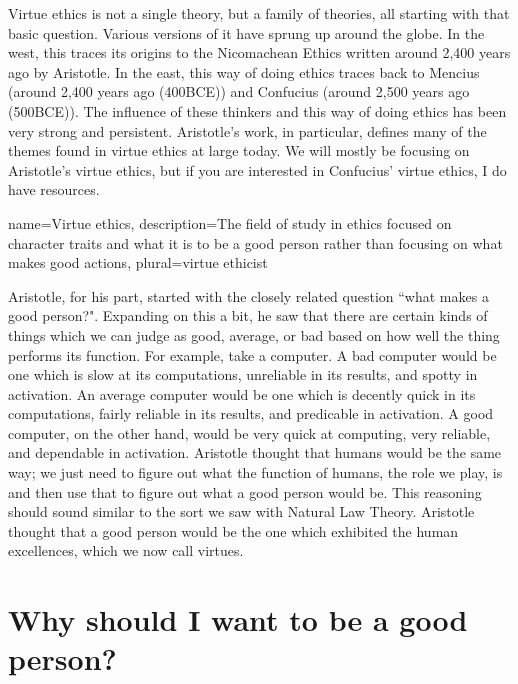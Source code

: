 \Gls{Virtue ethics} is not a single theory, but a family of theories, all starting with that basic question. Various versions of it have sprung up around the globe. In the west, this traces its origins to the Nicomachean Ethics written around 2,400 years ago by Aristotle. In the east, this way of doing ethics traces back to Mencius (around 2,400 years ago (400BCE)) and Confucius (around 2,500 years ago (500BCE)). The influence of these thinkers and this way of doing ethics has been very strong and persistent. Aristotle’s work, in particular, defines many of the themes found in virtue ethics at large today.  We will mostly be focusing on Aristotle’s virtue ethics, but if you are interested in Confucius’ virtue ethics, I do have resources.

{
  name=Virtue ethics,
  description={The field of study in ethics focused on character traits and what it is to be a good person rather than focusing on what makes good actions},
  plural=virtue ethicist
}



Aristotle, for his part, started with the closely related question ``what makes a good person?". Expanding on this a bit, he saw that there are certain kinds of things which we can judge as good, average, or bad based on how well the thing performs its function. For example, take a computer. A bad computer would be one which is slow at its computations, unreliable in its results, and spotty in activation. An average computer would be one which is decently quick in its computations, fairly reliable in its results, and predicable in activation. A good computer, on the other hand, would be very quick at computing, very reliable, and dependable in activation. Aristotle thought that humans would be the same way; we just need to figure out what the function of humans, the role we play, is and then use that to figure out what a good person would be. This reasoning should sound similar to the sort we saw with Natural Law Theory. Aristotle thought that a good person would be the one which exhibited the human excellences, which we now call virtues. 

\section{Why should I want to be a good person?}

